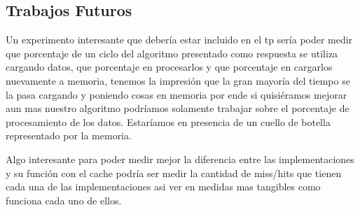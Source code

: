 \subsection{Trabajos Futuros}
Un experimento interesante que debería estar incluido en el tp sería poder medir que porcentaje de un ciclo del algoritmo presentado como respuesta se utiliza cargando datos, que porcentaje en procesarlos y que porcentaje en cargarlos nuevamente a memoria, tenemos la impresión que la gran mayoría del tiempo se la pasa cargando y poniendo cosas en memoria por ende si quisiéramos mejorar aun mas nuestro algoritmo podríamos solamente trabajar sobre el porcentaje de procesamiento de los datos. Estaríamos en presencia de un cuello de botella representado por la memoria.

Algo interesante para poder medir mejor la diferencia entre las implementaciones y su función con el cache podría ser medir la cantidad de miss/hits que tienen cada una de las implementaciones asi ver en medidas mas tangibles como funciona cada uno de ellos.
